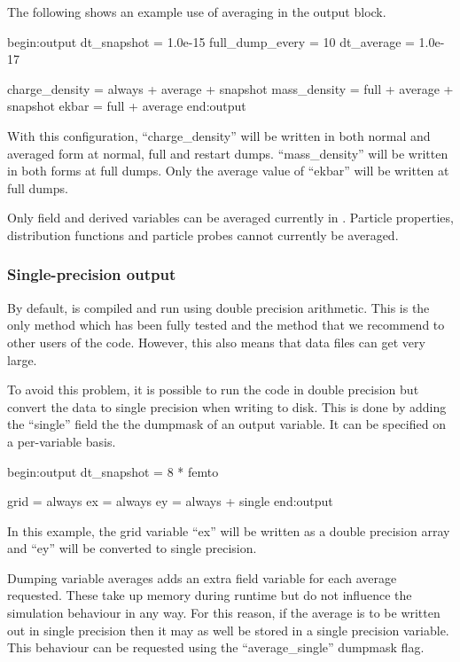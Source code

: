 The following shows an example use of averaging in the output block.
\begin{boxverbatim}
begin:output
   dt_snapshot = 1.0e-15
   full_dump_every = 10
   dt_average = 1.0e-17

   charge_density = always + average + snapshot
   mass_density = full + average + snapshot
   ekbar = full + average
end:output
\end{boxverbatim}

With this configuration, ``charge\_density'' will be written in both normal and
averaged form at normal, full and restart dumps. ``mass\_density'' will be
written in both forms at full dumps. Only the average value of
``ekbar'' will be written at full dumps.

Only field and derived variables can be averaged currently in {\EPOCH}.
Particle properties, distribution functions and particle probes cannot
currently be averaged.

\subsubsection{Single-precision output}
\label{sec:single_precision_output}

By default, {\EPOCH} is compiled and run using double precision arithmetic.
This is the only method which has been fully tested and the method that
we recommend to other users of the code. However, this also means that
data files can get very large.

To avoid this problem, it is possible to run the code in double precision
but convert the data to single precision when writing to disk. This is done
by adding the ``single'' field the the dumpmask of an output variable.
It can be specified on a per-variable basis.

\begin{boxverbatim}
begin:output
   dt_snapshot = 8 * femto

   grid = always
   ex = always
   ey = always + single
end:output
\end{boxverbatim}

In this example, the grid variable ``ex'' will be written as a
double precision array and ``ey'' will be converted to single
precision.

Dumping variable averages adds an extra field variable for each average
requested. These take up memory during runtime but do not influence the
simulation behaviour in any way. For this reason, if the average is to be
written out in single precision then it may as well be stored in a single
precision variable. This behaviour can be requested using the
``average\_single'' dumpmask flag.


